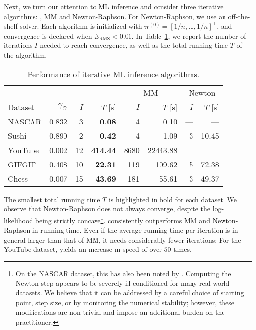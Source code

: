 Next, we turn our attention to ML inference and consider three iterative algorithms: \ILSR{}, MM and Newton-Raphson.
For Newton-Raphson, we use an off-the-shelf solver.
Each algorithm is initialized with $\bm{\pi}^{(0)} = [1/n, \ldots, 1/n]^\intercal$, and convergence is declared when $E_{\text{RMS}} < 0.01$.
In Table~\ref{tab:mlalg}, we report the number of iterations $I$ needed to reach convergence, as well as the total running time $T$ of the algorithm.

\begin{table}[ht]
  \vspace{-0.3cm}
  \caption{Performance of iterative ML inference algorithms.}
  \label{tab:mlalg}
  \centering
  \small{
  \begin{tabular}{l r rr rr rr}
    \toprule
             &             & \multicolumn{2}{c}{\ILSR{}}        & \multicolumn{2}{c}{MM}      & \multicolumn{2}{c}{Newton} \\
                             \cmidrule(l){3-4}                  \cmidrule(l){5-6}             \cmidrule(l){7-8}
    Dataset  & $\gamma_{\mathcal{D}}$ & $I$ &         $T$ [s] &        $I$ &        $T$ [s] &     $I$ &     $T$ [s] \\
    \midrule
    NASCAR   & \num{0.832} &  \num{3} &   \bfseries\num{0.08} &    \num{4} &     \num{0.10} &     --- &         --- \\
    Sushi    & \num{0.890} &  \num{2} &   \bfseries\num{0.42} &    \num{4} &     \num{1.09} & \num{3} & \num{10.45} \\
    \addlinespace
    YouTube  & \num{0.002} & \num{12} & \bfseries\num{414.44} & \num{8680} & \num{22443.88} &     --- &         --- \\
    GIFGIF   & \num{0.408} & \num{10} &  \bfseries\num{22.31} &  \num{119} &   \num{109.62} & \num{5} & \num{72.38} \\
    \addlinespace
    Chess    & \num{0.007} & \num{15} &  \bfseries\num{43.69} &  \num{181} &    \num{55.61} & \num{3} & \num{49.37} \\
    \bottomrule
  \end{tabular}
  }
\end{table}

The smallest total running time $T$ is highlighted in bold for each dataset.
We observe that Newton-Raphson does not always converge, despite the log-likelihood being strictly concave\footnote{
On the NASCAR dataset, this has also been noted by \citet{hunter2004mm}.
Computing the Newton step appears to be severely ill-conditioned for many real-world datasets.
We believe that it can be addressed by a careful choice of starting point, step size, or by monitoring the numerical stability;
however, these modifications are non-trivial and impose an additional burden on the practitioner.
}.
\ILSR{} consistently outperforms MM and Newton-Raphson in running time.
Even if the average running time per iteration is in general larger than that of MM, it needs considerably fewer iterations:
For the YouTube dataset, \ILSR{} yields an increase in speed of over $50$ times.

